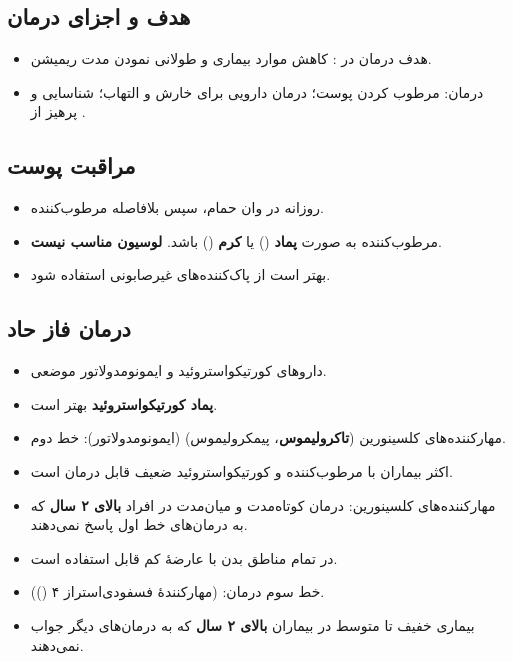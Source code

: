 \documentclass[12pt,a4paper]{article}
\begin{document}
\subsection*{هدف و اجزای درمان}
\begin{itemize}
\item هدف درمان در : کاهش موارد  بیماری و طولانی نمودن مدت ریمیشن.
\item درمان: مرطوب کردن پوست؛ درمان دارویی برای خارش و التهاب؛ شناسایی و پرهیز از .
\end{itemize}

\clearpage
{}
\subsection*{مراقبت پوست}
\begin{itemize}
\item روزانه  در وان حمام، سپس بلافاصله مرطوب‌کننده.
\item مرطوب‌کننده به صورت \textbf{پماد} () یا \textbf{کرم} () باشد. \textbf{لوسیون مناسب نیست}.
\item بهتر است از پاک‌کننده‌های غیرصابونی استفاده شود.
\end{itemize}

\subsection*{درمان فاز حاد}
\begin{itemize}
\item داروهای کورتیکواستروئید و ایمونومدولاتور موضعی.
\item \textbf{پماد کورتیکواستروئید} بهتر است.
\item مهارکننده‌های کلسینورین (\textbf{تاکرولیموس}، پیمکرولیموس) (ایمونومدولاتور): خط دوم.
\item اکثر بیماران با مرطوب‌کننده و کورتیکواستروئید ضعیف قابل درمان است.
\item مهارکننده‌های کلسینورین: درمان کوتاه‌مدت و میان‌مدت در افراد \textbf{بالای ۲ سال} که به درمان‌های خط اول پاسخ نمی‌دهند.
\item در تمام مناطق بدن با عارضهٔ کم قابل استفاده است.
\item خط سوم درمان: \textbf{} (مهارکنندهٔ فسفودی‌استراز ۴ ()).
\item بیماری خفیف تا متوسط در بیماران \textbf{بالای ۲ سال} که به درمان‌های دیگر جواب نمی‌دهند.
\end{itemize}
\end{document}
